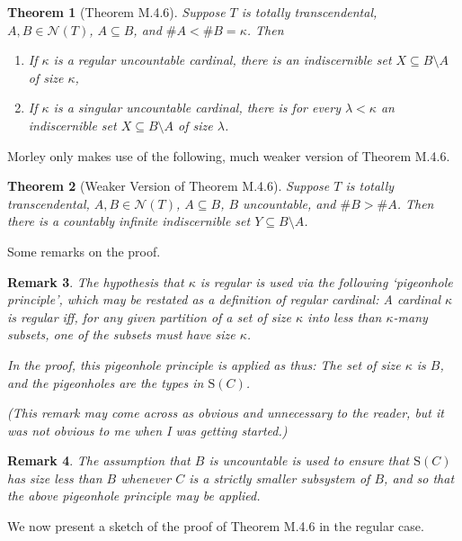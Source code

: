 \documentclass{article}
\newtheorem{theorem}{Theorem}[section]
\newtheorem{remark}[theorem]{Remark}
\theoremstyle{nonumberplain}
\newcommand{\calN}{\mathcal{N}}
\newcommand{\Stone}{\mathrm{S}}
\newcommand{\card}[1]{\#{#1}}
\begin{document}
\begin{theorem}[Theorem M.4.6]
Suppose $T$ is totally transcendental, $A,B \in \calN(T)$, $A \subseteq B$, and $\card A < \card B = \kappa$. Then
\begin{enumerate}[label=\roman*)]
\item If $\kappa$ is a regular uncountable cardinal, there is an indiscernible set $X \subseteq B \setminus A$ of size $\kappa$,
\item If $\kappa$ is a singular uncountable cardinal, there is for every $\lambda < \kappa$ an indiscernible set $X \subseteq B \setminus A$ of size $\lambda$.
\end{enumerate}
\end{theorem}

Morley only makes use of the following, much weaker version of Theorem M.4.6.

\begin{theorem}[Weaker Version of Theorem M.4.6]\label{thm:weak4.6}
Suppose $T$ is totally transcendental, $A,B \in \calN(T)$, $A \subseteq B$, $B$ uncountable, and $\card B > \card A$. Then there is a countably infinite indiscernible set $Y \subseteq B \setminus A$.
\end{theorem}

Some remarks on the proof.

\begin{remark}\label{rmk:pigeon}
The hypothesis that $\kappa$ is regular is used via the following `pigeonhole principle', which may be restated as a definition of regular cardinal: A cardinal $\kappa$ is regular iff, for any given partition of a set of size $\kappa$ into less than $\kappa$-many subsets, one of the subsets must have size $\kappa$.

In the proof, this pigeonhole principle is applied as thus: The set of size $\kappa$ is $B$, and the pigeonholes are the types in $\Stone(C)$.

(This remark may come across as obvious and unnecessary to the reader, but it was not obvious to me when I was getting started.)
\end{remark}

\begin{remark}
The assumption that $B$ is uncountable is used to ensure that $\Stone(C)$ has size less than $B$ whenever $C$ is a strictly smaller subsystem of $B$, and so that the above pigeonhole principle may be applied.
\end{remark}

We now present a sketch of the proof of Theorem M.4.6 in the regular case.
\end{document}
